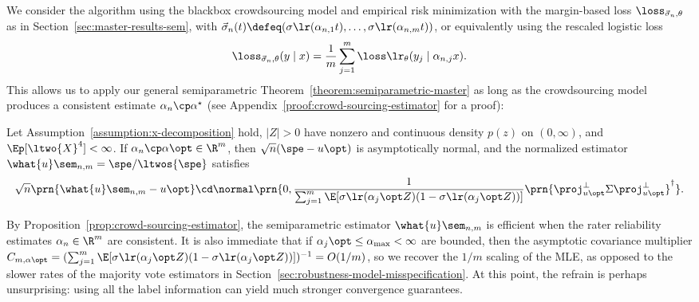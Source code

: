 
We consider the algorithm using the blackbox crowdsourcing model and
empirical risk minimization with the margin-based loss
$\loss_{\vec{\sigma}_n, \theta}$ as in Section~\ref{sec:master-results-sem},
with
$\vec{\sigma}_n(t)
\defeq (\sigma\lr(\alpha_{n,1}t),\dots, \sigma\lr(\alpha_{n,m}t))$,
or equivalently using the rescaled logistic loss
\begin{align*}
  \loss_{\vec{\sigma}_n, \theta}(y \mid x)
  = \frac{1}{m} \sum_{j=1}^m \loss\lr_\theta (y_j \mid \alpha_{n,j} x) .
\end{align*}
This allows us to apply our general semiparametric
Theorem~\ref{theorem:semiparametric-master} as long as the crowdsourcing
model produces a consistent estimate $\alpha_n \cp \alpha^\star$ (see
Appendix~\ref{proof:crowd-sourcing-estimator} for a proof):
\begin{proposition}
  \label{prop:crowd-sourcing-estimator}
  Let Assumption~\ref{assumption:x-decomposition} hold, $|Z| > 0$ have
  nonzero and continuous density $p(z)$ on $(0, \infty)$, and $\Ep
  [\ltwo{X}^4] < \infty$. If $\alpha_n \cp \alpha\opt \in \R^m$, then
  $\sqrt{n}(\spe - u\opt)$ is asymptotically normal, and the normalized
  estimator $\what{u}\sem_{n,m} = \spe / \ltwos{\spe}$ satisfies
  \begin{equation*}
    \sqrt{n} \prn{\what{u}\sem_{n,m} - u\opt}
    \cd \normal\prn{0,
      \frac{1}{\sum_{j = 1}^m \E[\sigma\lr(\alpha_j\opt Z)
          (1 - \sigma\lr(\alpha_j\opt Z))]}
      \prn{\proj_{u\opt}^\perp \Sigma \proj_{u\opt}^\perp}^\dagger}.
  \end{equation*}
\end{proposition}

By Proposition~\ref{prop:crowd-sourcing-estimator}, the semiparametric
estimator $\what{u}\sem_{n,m}$ is efficient when the rater reliability
estimates $\alpha_n \in \R^m$ are consistent.  It is also immediate that if
$\alpha_j\opt \le \alpha_{\max} < \infty$ are bounded, then the asymptotic
covariance multiplier $C_{m,\alpha\opt} = (\sum_{j = 1}^m
\E[\sigma\lr(\alpha_j\opt Z) (1 - \sigma\lr(\alpha_j\opt Z))])^{-1} =
O(1/m)$, so we recover the $1/m$ scaling of the MLE, as opposed to the
slower rates of the majority vote estimators in
Section~\ref{sec:robustness-model-misspecification}.  At this point, the
refrain is perhaps unsurprising: using all the label information can yield
much stronger convergence guarantees.
